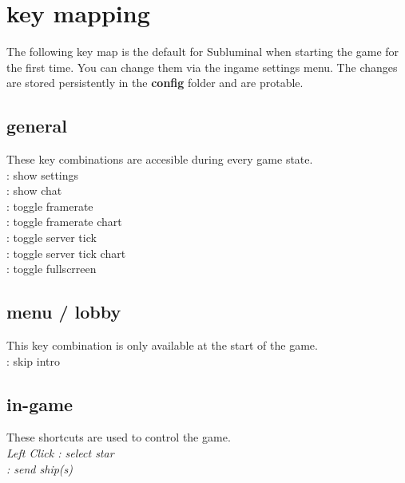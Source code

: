 \chapter*{key mapping}
The following key map is the default for Subluminal when starting the game for the first time. You can change them via the ingame settings menu. The changes are stored persistently in the \textbf{config} folder and are protable.

\section*{general}
These key combinations are accesible during every game state.\\[0.5em]
 : show settings \\[0.5em]
 : show chat \\[0.5em]
 : toggle framerate \\[0.5em]
 : toggle framerate chart \\[0.5em]
 : toggle server tick \\[0.5em]
 : toggle server tick chart \\[0.5em]
 : toggle fullscrreen \\[0.5em]
  
\section*{menu / lobby}
This key combination is only available at the start of the game.\\[0.5em]
\Esc : skip intro\\[0.5em]

\section*{in-game}
These shortcuts are used to control the game.\\[0.5em]
\it{Left Click} : select star \\[0.5em]
\Return : send ship(s) \\[0.5em]
